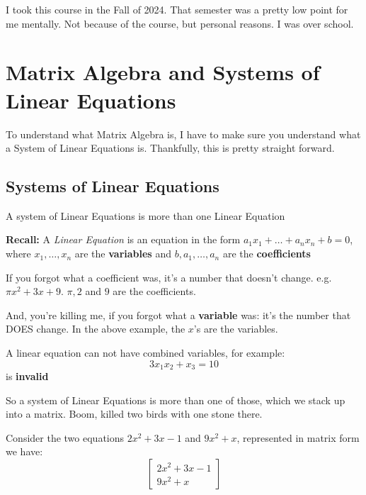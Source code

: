 I took this course in the Fall of 2024. That semester was a pretty low point for me mentally. Not
because of the course, but personal reasons. I was over school.


\section{Matrix Algebra and Systems of Linear Equations}
To understand what Matrix Algebra is, I have to make sure you understand what
a System of Linear Equations is. Thankfully, this is pretty straight forward.

\subsection{Systems of Linear Equations}
A system of Linear Equations is more than one Linear Equation

\begin{tcolorbox}[mybox]
    \textbf{Recall: } A \textit{Linear Equation} is an equation in the form
    \(a_1x_1 + \dots + a_{n} x_{n} +b = 0\), where \(x_1, \dots, x_{n}\) are the
    \textbf{variables} and \(b, a_1, \dots, a_n\) are the \textbf{coefficients}


    \vspace{1\baselineskip}

    If you forgot what a coefficient was, it's a number that doesn't change. e.g.
    \(\pi x^2 + 3x + 9\). \(\pi, 2\) and \(9\) are the coefficients.

    \vspace{1\baselineskip}

    And, you're killing me, if you forgot what a \textbf{variable} was: it's the
    number that DOES change. In the above example, the \(x\)'s are the variables.
\end{tcolorbox}


\begin{tcolorbox}[important]
     A linear equation can not have combined variables, for example:
    \begin{equation}
        3x_{1}x_{2} + x_{3} = 10
    \end{equation}
    is \textbf{invalid}
\end{tcolorbox}
So a system of Linear Equations is more than one of those, which we stack up into a matrix.
Boom, killed two birds with one stone there.

Consider the two equations \(2x^2 + 3x - 1 \) and \(9x^2 + x\), represented in matrix form
we have:
\begin{equation}
\begin{bmatrix}
    2x^2 + 3x - 1 \\
    9x^2 + x
\end{bmatrix}
\end{equation}

